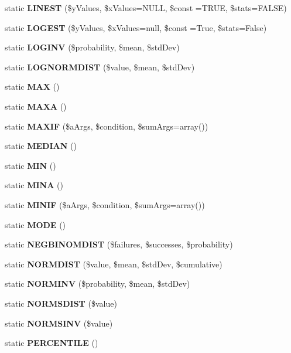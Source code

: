 \begin{DoxyCompactItemize}
\item 
static {\bf L\+I\+N\+E\+S\+T} (\$y\+Values, \$x\+Values=N\+U\+L\+L, \$const =T\+R\+U\+E, \$stats=F\+A\+L\+S\+E)
\item 
static {\bf L\+O\+G\+E\+S\+T} (\$y\+Values, \$x\+Values=null, \$const =True, \$stats=False)
\item 
static {\bf L\+O\+G\+I\+N\+V} (\$probability, \$mean, \$std\+Dev)
\item 
static {\bf L\+O\+G\+N\+O\+R\+M\+D\+I\+S\+T} (\$value, \$mean, \$std\+Dev)
\item 
static {\bfseries M\+A\+X} ()\label{class_p_h_p_excel___calculation___statistical_a2a2b9505621ddc72fee1da5f739cbbf0}

\item 
static {\bfseries M\+A\+X\+A} ()\label{class_p_h_p_excel___calculation___statistical_a4c797b7f09d0bf716fdf6d55510c8af4}

\item 
static {\bfseries M\+A\+X\+I\+F} (\$a\+Args, \$condition, \$sum\+Args=array())\label{class_p_h_p_excel___calculation___statistical_a2f0a3c10e2fe947ff133ae290647b034}

\item 
static {\bfseries M\+E\+D\+I\+A\+N} ()\label{class_p_h_p_excel___calculation___statistical_a8e2fbb75c67f082536d85cf9cc3f7ad2}

\item 
static {\bfseries M\+I\+N} ()\label{class_p_h_p_excel___calculation___statistical_ab99cf660afb9541d345c9e827854f1a7}

\item 
static {\bfseries M\+I\+N\+A} ()\label{class_p_h_p_excel___calculation___statistical_ab1c9aa7a84eabdac89a2354a320e2e6e}

\item 
static {\bfseries M\+I\+N\+I\+F} (\$a\+Args, \$condition, \$sum\+Args=array())\label{class_p_h_p_excel___calculation___statistical_a7295f4bb06ab1c609e44335826d977fc}

\item 
static {\bfseries M\+O\+D\+E} ()\label{class_p_h_p_excel___calculation___statistical_a7a8755173e8e1686c45f52ae2d2a0823}

\item 
static {\bf N\+E\+G\+B\+I\+N\+O\+M\+D\+I\+S\+T} (\$failures, \$successes, \$probability)
\item 
static {\bf N\+O\+R\+M\+D\+I\+S\+T} (\$value, \$mean, \$std\+Dev, \$cumulative)
\item 
static {\bf N\+O\+R\+M\+I\+N\+V} (\$probability, \$mean, \$std\+Dev)
\item 
static {\bf N\+O\+R\+M\+S\+D\+I\+S\+T} (\$value)
\item 
static {\bf N\+O\+R\+M\+S\+I\+N\+V} (\$value)
\item 
static {\bfseries P\+E\+R\+C\+E\+N\+T\+I\+L\+E} ()\label{class_p_h_p_excel___calculation___statistical_ad712dca44c3105537a54b7c18628b20f}


\end{DoxyCompactItemize}
